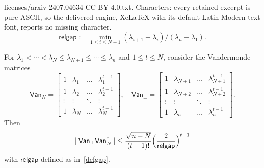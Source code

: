 \documentclass[10pt,a4paper]{amsart}
\newcommand{\gap}{\mathsf{relgap}}
\newcommand{\van}{\mathsf{Van}}
\providecommand{\norm}[1]{\lVert#1\rVert}
\begin{document}
licenses/arxiv-2407.04634-CC-BY-4.0.txt. Characters: every retained excerpt is pure ASCII, so the delivered engine, XeLaTeX with its default Latin Modern text font, reports no missing character.
    \begin{equation}
        \label{defgap}
        \gap := \min_{1\leq i\leq N-1}( \lambda_{i+1}-\lambda_{i} ) / (\lambda_{n}-\lambda_{1}).
    \end{equation}   

\begin{lemma}
    \label{lemVan}
    For $\lambda_1 < \dotsb < \lambda_N \le \lambda_{N+1} \le \dotsb \le \lambda_n$ and     $1\leq t\leq N$, consider the 
    Vandermonde matrices 
    \begin{equation}
        \label{defVan}
        \van_{N} = \begin{bmatrix}
            1 & \lambda_{1} & \ldots & \lambda_{1}^{t-1}\\ 
            1 & \lambda_{2} & \ldots & \lambda_{2}^{t-1}\\ 
            \vdots & \vdots & \ddots & \vdots\\
            1 & \lambda_{N} & \ldots & \lambda_{N}^{t-1} 
        \end{bmatrix}, \quad 
        \van_{\perp} = \begin{bmatrix}
            1 & \lambda_{N+1} & \ldots & \lambda_{N+1}^{t-1}\\ 
            1 & \lambda_{N+2} & \ldots & \lambda_{N+2}^{t-1}\\ 
            \vdots & \vdots & \ddots & \vdots\\
            1 & \lambda_{n} & \ldots & \lambda_{n}^{t-1} 
        \end{bmatrix}.
    \end{equation} 
    Then 
    \begin{equation*}
        \norm{\van_{\perp}\van_{N}^{\dagger}}\leq \frac{\sqrt{n-N}}{(t-1)!}\Bigl(\frac{2}{\gap}\Bigr)^{t-1}
    \end{equation*}
    with $\gap$ defined as in~\cref{defgap}.
\end{lemma}
\end{document}
